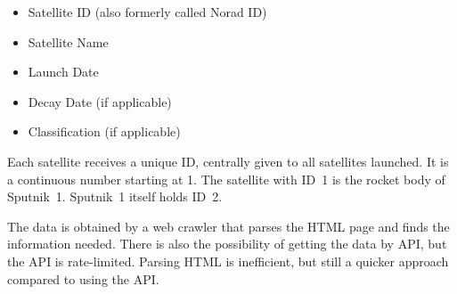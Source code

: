\begin{itemize}
	\item Satellite ID (also formerly called Norad ID)
	\item Satellite Name
	\item Launch Date
	\item Decay Date (if applicable)
	\item Classification (if applicable)
\end{itemize}

Each satellite receives a unique ID, centrally given to all satellites
launched. It is a continuous number starting at 1. The satellite with ID~1 is
the rocket body of Sputnik~1. Sputnik~1 itself holds ID~2.

The data is obtained by a web crawler that parses the HTML page and finds the
information needed. There is also the possibility of getting the data by API,
but the API is rate-limited. Parsing HTML is inefficient, but still a quicker
approach compared to using the API.
